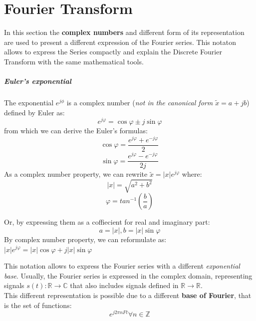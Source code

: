 \documentclass[10pt,a4paper]{report}
\theoremstyle{definition}
\begin{document}
\section{Fourier Transform}
In this section the \textbf{complex numbers} and different form of its representation are used to present a different expression of the Fourier series. This notaton allows to express the Series compactly and explain the Discrete Fourier Transform with the same mathematical tools.

\subparagraph{Euler's exponential}
The exponential $e^{j\phi}$ is a complex number (\textit{not in the canonical form $\tilde{x} = a+jb$}) defined by Euler as:
\begin{equation}
	e^{j\varphi} =  \cos{\varphi} \pm j\sin{\varphi}
\end{equation}
from which we can derive the Euler's formulas:
\begin{equation}
	\cos{\varphi} = \frac{e^{j\varphi} + e^{-j\varphi}}{2}
\end{equation}
\begin{equation}
	\sin{\varphi} = \frac{e^{j\varphi} - e^{-j\varphi}}{2j}
\end{equation}
As a complex number property, we can rewrite $\tilde{x} = |x|e^{j\varphi}$ where:
\begin{equation}
	|x| =  \sqrt{a^{2}+b^{2}}
\end{equation}
\begin{equation}
	\varphi = tan^{-1}(\frac{b}{a})
\end{equation}

Or, by expressing them as a coffiecient for real and imaginary part:
\begin{equation}
	a = |x|, b = |x|\sin{\varphi}
\end{equation}
By complex number property, we can reformulate as:
$|x|e^{j\varphi} = |x|\cos{\varphi} + j|x|\sin{\varphi}$

This notation allows to express the Fourier series with a different \textit{exponential base}. Usually, the Fourier series is expressed in the complex domain, representing signals $s(t): \mathbb{R} \rightarrow \mathbb{C}$ that also includes signals defined in $\mathbb{
R} \rightarrow \mathbb{R}$. \\
This different representation is possible due to a different \textbf{base of Fourier}, that is the set of functions:
\begin{equation}
	e^{j2\pi nFt} \forall n \in \mathbb{Z}
\end{equation}
\end{document}
